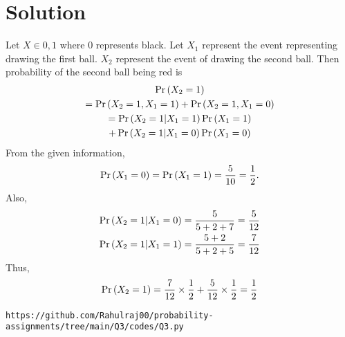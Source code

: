 \documentclass{article}
\begin{document}
\section*{\large Solution}
Let $X \in {0,1}$ where 0 represents black.  Let $X_1$ represent the event representing drawing the first ball. $X_2$ represent the event of drawing the second ball.
Then  probability of the second ball being red is
\begin{multline}
\Pr\left(X_2 = 1\right) 
\\
= \Pr\left(X_2 = 1,X_1 = 1\right)+\Pr\left(X_2 = 1,X_1 = 0\right)
\\
=\Pr\left(X_2 = 1|X_1 = 1\right)\Pr\left(X_1 = 1\right)
\\
+\Pr\left(X_2 = 1|X_1 = 0\right)\Pr\left(X_1 = 0\right)
\end{multline}
From the given information,
\begin{align}
\Pr\left(X_1 = 0\right) = \Pr\left(X_1 = 1\right)
=\frac{5}{10}=\frac{1}{2}.
\end{align}
Also, 
\begin{align}
\Pr\left(X_2 = 1|X_1 = 0\right) &= \frac{5}{5+2+7} = \frac{5}{12}
\\
\Pr\left(X_2 = 1|X_1 = 1\right) &= \frac{5+2}{5+2+5} = \frac{7}{12}
\end{align}
Thus, 
\begin{align}
\Pr\left(X_2 = 1\right) = \frac{7}{12}\times \frac{1}{2} 
+ \frac{5}{12}\times \frac{1}{2}
=\frac{1}{2}
\end{align}
\begin{lstlisting}
https://github.com/Rahulraj00/probability-assignments/tree/main/Q3/codes/Q3.py
\end{lstlisting}
\end{document}
